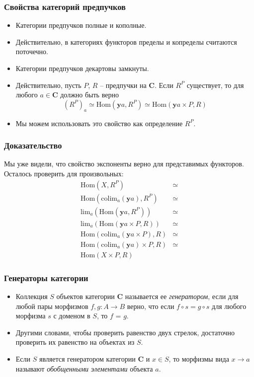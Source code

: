 \documentclass{beamer}
\theoremstyle{definition}
\newcommand{\cat}[1]{\mathbf{#1}}
\renewcommand{\C}{\cat{C}}
\newcommand{\y}{\cat{y}}
\newcommand{\Hom}{\mathrm{Hom}}
\newcommand{\limit}{\mathrm{lim}}
\newcommand{\colim}{\mathrm{colim}}
\begin{document}
\begin{frame}
\frametitle{Свойства категорий предпучков}
\begin{itemize}
\item Категории предпучков полные и кополные.
\item Действительно, в категориях функторов пределы и копределы считаются поточечно.
\item Категории предпучков декартовы замкнуты.
\item Действительно, пусть $P$, $R$ -- предпучки на $\C$.
Если $R^P$ существует, то для любого $a \in \C$ должно быть верно
\[ (R^P)_a \simeq \Hom(\y a, R^P) \simeq \Hom(\y a \times P, R) \]
\item Мы можем использовать это свойство как определение $R^P$.
\end{itemize}
\end{frame}

\begin{frame}
\frametitle{Доказательство}
Мы уже видели, что свойство экспоненты верно для представимых функторов.
Осталось проверить для произвольных:
\begin{align*}
\Hom(X,R^P) & \simeq \\
\Hom(\colim_a(\y a),R^P) & \simeq \\
\limit_a(\Hom(\y a,R^P)) & \simeq \\
\limit_a(\Hom(\y a \times P, R)) & \simeq \\
\Hom(\colim_a(\y a \times P), R) & \simeq \\
\Hom(\colim_a(\y a) \times P, R) & \simeq \\
\Hom(X \times P, R) &
\end{align*}
\end{frame}

\begin{frame}
\frametitle{Генераторы категории}
\begin{itemize}
\item Коллекция $S$ объектов категории $\C$ называется ее \emph{генератором}, если для любой пары морфизмов $f,g : A \to B$ верно, что
если $f \circ s = g \circ s$ для любого морфизма $s$ с доменом в $S$, то $f$ = $g$.
\item Другими словами, чтобы проверить равенство двух стрелок, достаточно проверить их равенство на объектах из $S$.
\item Если $S$ является генератором категории $\C$ и $x \in S$, то морфизмы вида $x \to a$ называют \emph{обобщенными элементами} объекта $a$.
\end{itemize}
\end{frame}
\end{document}
